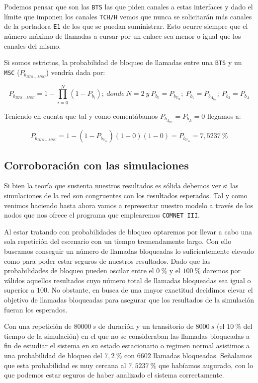 \documentclass[10pt]{article}
\begin{document}
			Podemos pensar que son las \texttt{BTS} las que piden canales a estas interfaces y dado el límite que imponen los canales \texttt{TCH/H} vemos que nunca se solicitarán más canales de la portadora \texttt{E1} de los que se puedan suministrar. Esto ocurre siempre que el número máximo de llamadas a cursar por un enlace sea menor o igual que los canales del mismo.

			Si somos estrictos, la probabilidad de bloqueo de llamadas entre una \texttt{BTS} y un \texttt{MSC} ($P_{b_{BTS-MSC}}$) vendría dada por:

			\begin{equation}
				P_{b_{BTS-MSC}} = 1 - \prod_{i = 0}^N (1 - P_{b_i});\ donde\ N = 2\ y\ P_{b_0} = P_{b_{U_m}};\ P_{b_1} = P_{b_{A_{bis}}};\ P_{b_2} = P_{b_A}
				\label{eq:Pb}
			\end{equation}

			Teniendo en cuenta que tal y como comentábamos $P_{b_{A_{bis}}} = P_{b_A} = 0$ llegamos a:

			$$P_{b_{BTS-MSC}} = 1 - (1 - P_{b_{U_m}})(1 - 0)(1 - 0) = P_{b_{U_m}} = 7,5237\ \%$$

		\subsection{Corroboración con las simulaciones}
			Si bien la teoría que sustenta nuestros resultados es sólida debemos ver si las simulaciones de la red son congruentes con los resultados esperados. Tal y como venimos haciendo hasta ahora vamos a representar nuestro modelo a través de los nodos que nos ofrece el programa que emplearemos \texttt{COMNET III}.

			Al estar tratando con probabilidades de bloqueo optaremos por llevar a cabo una sola repetición del escenario con un tiempo tremendamente largo. Con ello buscamos conseguir un número de llamadas bloqueadas lo suficientemente elevado como para poder estar seguros de nuestros resultados. Dado que las probabilidades de bloqueo pueden oscilar entre el $0\ \%$ y el $100\ \%$ daremos por válidos aquellos resultados cuyo número total de llamadas bloqueadas sea igual o superior a $100$. No obstante, en busca de una mayor exactitud decidimos elevar el objetivo de llamadas bloqueadas para asegurar que los resultados de la simulación fueran los esperados.

			Con una repetición de $80000\ s$ de duración y un transitorio de $8000\ s$ (el $10\ \%$ del tiempo de la simulación) en el que no se consideraban las llamadas bloqueadas a fin de estudiar el sistema en su estado estacionario o regimen normal asistimos a una probabilidad de bloqueo del $7,2\ \%$ con $6602$ llamadas bloqueadas. Señalamos que esta probabilidad es muy cercana al $7,5237\ \%$ que habíamos augurado, con lo que podemos estar seguros de haber analizado el sistema correctamente.
\end{document}
